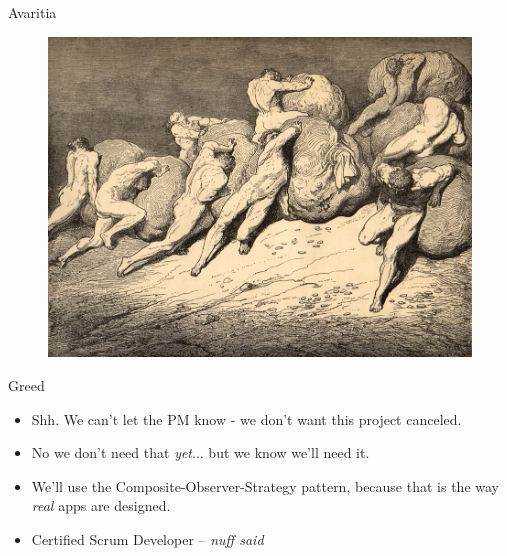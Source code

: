 \documentclass[12pt,xcolor=x11names]{beamer}
\begin{document}
\begin{frame}{Avaritia}
    \begin{figure}
        \centering \includegraphics[height=0.75\textheight]{greed.jpg}
    \end{figure}
\end{frame}
\begin{frame}{Greed}
    \begin{itemize}
        \item Shh. We can't let the PM know - we don't want this project
            canceled.
        \item No we don't need that \emph{yet}... but we know we'll need it.
        \item We'll use the Composite-Observer-Strategy pattern, because that
            is the way \emph{real} apps are designed.
        \item Certified Scrum Developer -- \emph{nuff said}
    \end{itemize}
\end{frame}
\end{document}
